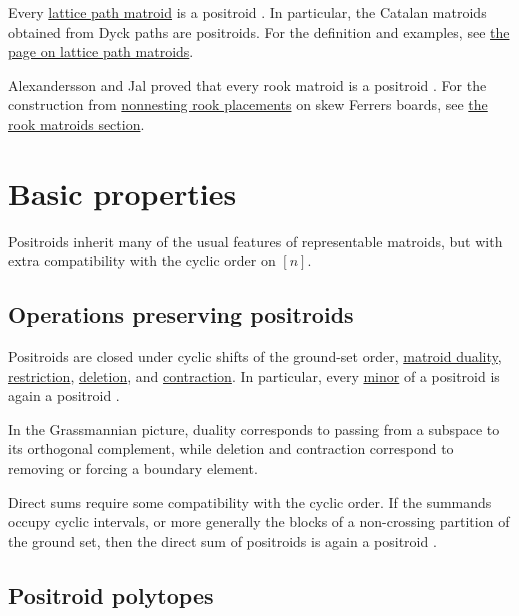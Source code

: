 \begin{example}
Every \hyperref[latticePathMatroidDefinition]{lattice path matroid} is a
positroid \cite{Oh2011}.  In particular, the Catalan matroids obtained from
Dyck paths are positroids.  For the definition and examples, see
\hyperref[latticePathMatroids]{the page on lattice path matroids}.
\end{example}

\begin{example}
Alexandersson and Jal proved that every rook matroid is a positroid
\cite{AlexanderssonJal2024x}.  For the construction from
\hyperref[nonNestingRookPlacement]{nonnesting rook placements} on skew Ferrers
boards, see \hyperref[rookMatroids]{the rook matroids section}.
\end{example}


\section[positroidProperties]{Basic properties}

Positroids inherit many of the usual features of representable matroids, but
with extra compatibility with the cyclic order on $[n]$.

\subsection[positroidOperations]{Operations preserving positroids}

Positroids are closed under cyclic shifts of the ground-set order,
\hyperref[matroidDual]{matroid duality}, \hyperref[matroidRestriction]{restriction},
\hyperref[matroidDeletion]{deletion}, and
\hyperref[matroidContraction]{contraction}.  In particular, every
\hyperref[matroidMinors]{minor} of a
positroid is again a positroid \cite{ArdilaRinconWilliams2014}.

In the Grassmannian picture, duality corresponds to passing from a subspace
to its orthogonal complement, while deletion and contraction correspond to
removing or forcing a boundary element.

Direct sums require some compatibility with the cyclic order.  If the summands
occupy cyclic intervals, or more generally the blocks of a non-crossing
partition of the ground set, then the direct sum of positroids is again a
positroid \cite{ArdilaRinconWilliams2014}.


\subsection[positroidPolytopes]{Positroid polytopes}

